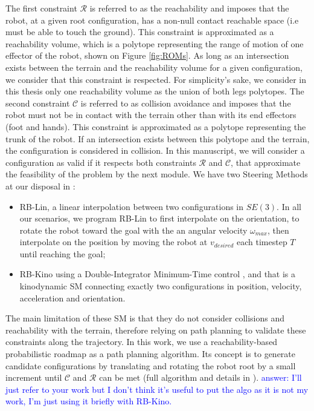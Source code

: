 The first constraint $\mathcal{R}$ is referred to as the reachability and imposes that the robot, at a given root configuration, has a non-null contact reachable space (i.e must be able to touch the ground). 
This constraint is approximated as a reachability volume, which is a polytope representing the range of motion of one effector of the robot, shown on Figure \ref{fig:ROMs}.
As long as an intersection exists between the terrain and the reachability volume for a given configuration, we consider that this constraint is respected.
For simplicity's sake, we consider in this thesis only one reachability volume as the union of both legs polytopes.
The second constraint $\mathcal{C}$ is referred to as collision avoidance and imposes that the robot must not be in contact with the terrain other than with its end effectors (foot and hands). This constraint is approximated as a polytope representing the trunk of the robot. If an intersection exists between this polytope and the terrain, the configuration is considered in collision.
In this manuscript, we will consider a configuration as valid if it respects both constraints $\mathcal{R}$ and $\mathcal{C}$, that approximate the feasibility of the problem by the next module.
We have two Steering Methods at our disposal in \cite{loco3d}:
\begin{itemize}
    \item RB-Lin, a linear interpolation between two configurations in $SE(3)$. In all our scenarios, we program RB-Lin to first interpolate on the orientation, to rotate the robot toward the goal with the an angular velocity $\omega_{max}$, then interpolate on the position by moving the robot at $v_{desired}$ each timestep $T$ until reaching the goal;
    \item RB-Kino \cite{kinodynamic-sm} using a Double-Integrator Minimum-Time control \cite{DIMT}, and that is a kinodynamic SM connecting exactly two configurations in position, velocity, acceleration and orientation.
\end{itemize}
The main limitation of these SM is that they do not consider collisions and reachability with the terrain, therefore relying on path planning to validate these constraints along the trajectory.
In this work, we use a reachability-based probabilistic roadmap \cite{RB-PRM} as a path planning algorithm. 
Its concept is to generate candidate configurations by translating and rotating the robot root by a small increment until $\mathcal{C}$ and $\mathcal{R}$ can be met (full algorithm and details in \cite{thesis_steve}).
\textcolor{blue}{answer: I'll just refer to your work but I don't think it's useful to put the algo as it is not my work, I'm just using it briefly with RB-Kino.}

